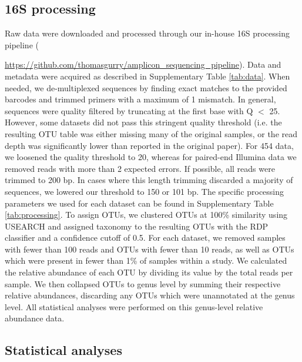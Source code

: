 \subsection*{16S processing}
Raw data were downloaded and processed through our in-house 16S processing pipeline ({\url{ https://github.com/thomasgurry/amplicon_sequencing_pipeline}).
Data and metadata were acquired as described in Supplementary Table \ref{tab:data}.
When needed, we de-multiplexed sequences by finding exact matches to the provided barcodes and trimmed primers with a maximum of 1 mismatch.
In general, sequences were quality filtered by truncating at the first base with Q $<$ 25.
However, some datasets did not pass this stringent quality threshold (i.e. the resulting OTU table was either missing many of the original samples, or the read depth was significantly lower than reported in the original paper).
For 454 data, we loosened the quality threshold to 20, whereas for paired-end Illumina data we removed reads with more than 2 expected errors.
If possible, all reads were trimmed to 200 bp.
In cases where this length trimming discarded a majority of sequences, we lowered our threshold to 150 or 101 bp.
The specific processing parameters we used for each dataset can be found in Supplementary Table \ref{tab:processing}.
To assign OTUs, we clustered OTUs at 100\% similarity using USEARCH \cite{edgar-usearch-2010} and assigned taxonomy to the resulting OTUs with the RDP classifier \cite{wang2007naive} and a confidence cutoff of 0.5.
For each dataset, we removed samples with fewer than 100 reads and OTUs with fewer than 10 reads, as well as OTUs which were present in fewer than 1\% of samples within a study.
We calculated the relative abundance of each OTU by dividing its value by the total reads per sample.
We then collapsed OTUs to genus level by summing their respective relative abundances, discarding any OTUs which were unannotated at the genus level.
All statistical analyses were performed on this genus-level relative abundance data.

\subsection{Statistical analyses}

}
